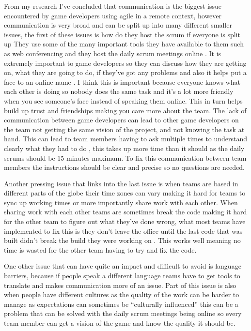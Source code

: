 \documentclass{scrartcl}
\begin{document}
From my research I’ve concluded that communication is the biggest issue encountered by game developers using agile in a remote context, however communication is very broad and can be split up into many different smaller issues, the first of these issues is how do they host the scrum if everyone is split up They use some of the many important tools they have available to them such as web conferencing and they host the daily scrum meetings online \cite{1609824}. It is extremely important to game developers so they can discuss how they are getting on, what they are going to do, if they’ve got any problems and also it helps put a face to an online name \cite{1609824}. I think this is important because everyone knows what each other is doing so nobody does the same task and it’s a lot more friendly when you see someone’s face instead of speaking them online. This in turn helps build up trust and friendships making you care more about the team. The lack of communication between game developers can lead to other game developers on the team not getting the same vision of the project, and not knowing the task at hand. This can lead to team members having to ask multiple times to understand clearly what they had to do \cite{7577420}, this takes up more time than it should as the daily scrums should be 15 minutes maximum. To fix this communication between team members the instructions should be clear and precise so no questions are needed. \par
Another pressing issue that links into the last issue is when teams are based in different parts of the globe their time zones can vary making it hard for teams to sync up working times \cite{4638656} \cite{4293626} or more importantly share work with each other. When sharing work with each other teams are sometimes break the code making it hard for the other team to figure out what they’ve done wrong, what most teams have implemented to fix this is they don’t leave the office until the last code that was built didn’t break the build they were working on \cite{1609824}. This works well meaning no time is wasted for the other team having to try and fix the code. \par
One other issue that can have quite an impact and difficult to avoid is language barriers, because if people speak a different language \cite{kaur2015distributed} teams have to get tools to translate and makes communication more of an issue. Part of this issue is also when people have different cultures \cite{4293626} as the quality of the work can be harder to manage as expectations can sometimes be “culturally influenced” \cite{6005502} this can be a problem that can be solved with the daily scrum meetings being online so every team member can get a vision of the game and know the quality it should be. \par
\end{document}
